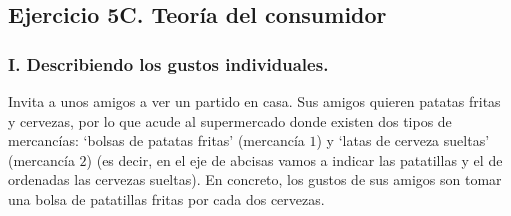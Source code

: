 \subsection*{\center Ejercicio 5C. Teoría del consumidor}
\vspace{1cm}

\subsubsection*{\center I. Describiendo los gustos individuales.}
\vspace{.5cm}

Invita a unos amigos a ver un partido en casa. Sus amigos quieren patatas fritas y cervezas, por lo que acude al supermercado donde existen dos tipos de mercancías: $‘$bolsas de patatas fritas$’$ (mercancía $1$) y $‘$latas de cerveza sueltas$’$ (mercancía $2$) (es decir, en el eje de abcisas vamos a indicar las patatillas y el de ordenadas las cervezas sueltas). En concreto, los gustos de sus amigos son tomar una bolsa de patatillas fritas por cada dos cervezas.\\\\

